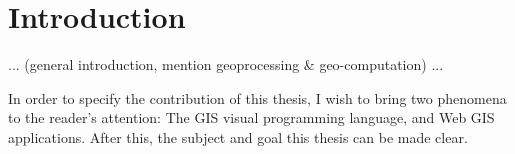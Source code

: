 \chapter{Introduction}

... (general introduction, mention geoprocessing \& geo-computation) ...



In order to specify the contribution of this thesis, I wish to bring two phenomena to the reader's attention: The GIS visual programming language, and Web GIS applications. 
After this, the subject and goal this thesis can be made clear.






